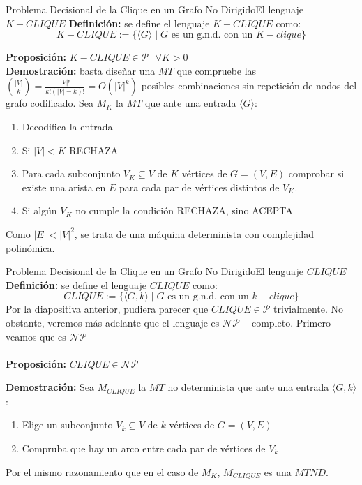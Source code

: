 \documentclass[10pt, envcountsect, presentation, aspectratio=169]{beamer}
\begin{document}
\begin{frame}{Problema Decisional de la Clique en un Grafo No Dirigido}{El lenguaje $K-CLIQUE$}
    \textbf{Definición:} se define el lenguaje $K-CLIQUE$ como:
    $$
    K-CLIQUE:=\{\langle G \rangle \mid G \text{ es un g.n.d. con un } K-clique\}
    $$

    \textbf{Proposición:} $K-CLIQUE \in \mathcal{P} \text{  } \forall K>0$ \\
    \textbf{Demostración:} basta diseñar una $MT$ que compruebe las $\binom{|V|}{k} = \frac{|V|!}{k!(|V|-k)!}=O(|V|^k)$ posibles combinaciones sin repetición de nodos del grafo codificado. Sea $M_K$ la $MT$ que ante una entrada $\langle G \rangle$:
    \begin{enumerate}[I]
        \item Decodifica la entrada
        \item Si $|V|<K$ RECHAZA
        \item Para cada subconjunto $V_K\subseteq V$ de $K$ vértices de $G=(V,E)$ comprobar si existe una arista en $E$ para cada par de vértices distintos de $V_K$.
        \item Si algún $V_K$ no cumple la condición RECHAZA, sino ACEPTA
    \end{enumerate}
    Como $|E|<|V|^2$, se trata de una máquina determinista con complejidad polinómica.
\end{frame}

\begin{frame}{Problema Decisional de la Clique en un Grafo No Dirigido}{El lenguaje $CLIQUE$}
    \textbf{Definición:} se define el lenguaje $CLIQUE$ como:
    $$
    CLIQUE:=\{\langle G, k \rangle \mid G \text{ es un g.n.d. con un } k-clique\}
    $$
    Por la diapositiva anterior, pudiera parecer que $CLIQUE \in \mathcal{P}$ trivialmente.
    No obstante, veremos más adelante que el lenguaje es $\mathcal{NP}-$completo. Primero veamos que es $\mathcal{NP}$ \\~\\

    \textbf{Proposición:} $CLIQUE \in \mathcal{NP}$

    \textbf{Demostración: } Sea $M_{CLIQUE}$ la $MT$ no determinista que ante una entrada $\langle G, k \rangle$:

    \begin{enumerate}[I]
        \item Elige un subconjunto $V_k \subseteq V$ de $k$ vértices de $G=(V,E)$
        \item Compruba que hay un arco entre cada par de vértices de $V_k$
    \end{enumerate}

    Por el mismo razonamiento que en el caso de $M_K$, $M_{CLIQUE}$ es una $MTND$.
\end{frame}
\end{document}
